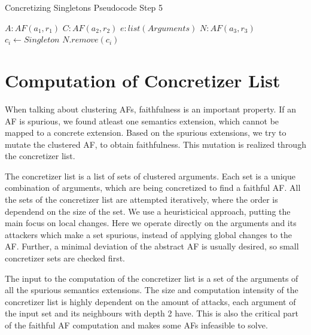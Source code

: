 \begin{algorithm}[H]
    \caption{Concretizing Singletons Pseudocode Step 5}\label{alg:concretizingSingletonsStep5}
    \begin{algorithmic}[1]
        \Require $A: AF(a_1, r_1)$ 
        \Require $C: AF(a_2, r_2)$ 
        \Require $e: list(Arguments)$ 
        \Require $N: AF(a_3, r_3)$ 
                \State $c_i \gets Singleton$
                \State $N.remove(c_i)$
            \EndIf
        \EndFor
    \end{algorithmic}
\end{algorithm}


\newpage
\section{Computation of Concretizer List}
\label{sec:ComputationOfConcretizerList}
When talking about clustering AFs, faithfulness is an important property. If an AF is spurious, we found atleast one semantics extension, which cannot be mapped to a concrete extension. Based on the spurious extensions, we try to mutate the clustered AF, to obtain faithfulness. This mutation is realized through the concretizer list.

The concretizer list is a list of sets of clustered arguments. Each set is a unique combination of arguments, which are being concretized to find a faithful AF. All the sets of the concretizer list are attempted iteratively, where the order is dependend on the size of the set. We use a heuristicical approach, putting the main focus on local changes. Here we operate directly on the arguments and its attackers which make a set spurious, instead of applying global changes to the AF. Further, a minimal deviation of the abstract AF is usually desired, so small concretizer sets are checked first.

The input to the computation of the concretizer list is a set of the arguments of all the spurious semantics extensions. The size and computation intensity of the concretizer list is highly dependent on the amount of attacks, each argument of the input set and its neighbours with depth 2 have. This is also the critical part of the faithful AF computation and makes some AFs infeasible to solve.

